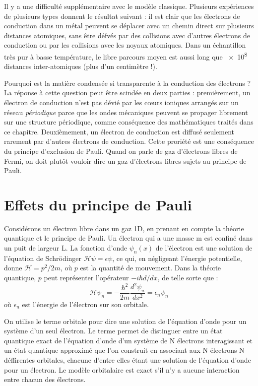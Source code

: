 Il y a une difficulté supplémentaire avec le modèle classique. Plusieurs
expériences de plusieurs types donnent le résultat suivant : il est clair que les
électrons de conduction dans un métal peuvent se déplacer avec un chemin direct 
sur plusieurs distances atomiques, sans être défvés par des collisions avec
d'autres électrons de conduction ou par les collisions avec les noyaux atomiques.
Dans un échantillon très pur à basse température, le libre parcours moyen est
aussi long que \SI{e8}{} distances inter-atomiques (plus d'un centimètre !).

Pourquoi est la matière condensée si transparente à la conduction des électrons ?
La réponse à cette question peut être scindée en deux parties : premièrement, un
électron de conduction n'est pas dévié par les cœurs ioniques arrangés sur un
réseau \emph{périodique} parce que les ondes mécaniques peuvent se propager 
librement sur une structure périodique, comme conséquence des mathématiques 
traités dans ce chapitre. Deuxièmement, un électron de conduction est diffusé
seulement rarement par d'autres électrons de conduction. Cette proriété est une
conséquence du principe d'exclusion de Pauli. Quand on parle de gaz d'électrons
libres de Fermi, on doit plutôt vouloir dire un gaz d'électrons libres sujets au
principe de Pauli.


\section{Effets du principe de Pauli}

Considérons un électron libre dans un gaz 1D, en prenant en compte la théorie 
quantique et le principe de Pauli. Un électron qui a une masse m est confiné dans
un puit de largeur L. La fonction d'onde $\psi_n(x)$ de l'électron est une
solution de l'équation de Schrödinger $\mathcal{H}\psi = \epsilon \psi$, ce qui,
en négligeant l'énergie potentielle, donne $\mathcal{H} = p^2/2m$, où $p$ est la
quantité de mouvement. Dans la théorie quantique, $p$ peut représenter 
l'opérateur $-i\hbar d/dx$, de telle sorte que :
\begin{equation}
    \mathcal{H}\psi_n = -\frac{\hbar^2}{2m} \frac{d^2\psi_n}{dx^2}
    = \epsilon_n\psi_n
\end{equation}
où $\epsilon_n$ est l'énergie de l'électron sur son orbitale.

On utilise le terme orbitale pour dire une solution de l'équation d'onde pour un
système d'un seul électron. Le terme permet de distinguer entre un état quantique
exact de l'équation d'onde d'un système de N électrons interagissant et un état
quantique approximé que l'on construit en associant aux N électrons N
déffirentes orbitales, chacune d'entre elles étant une solution de l'équation
d'onde pour un électron. Le modèle orbitalaire est exact s'il n'y a aucune
interaction entre chacun des électrons.


